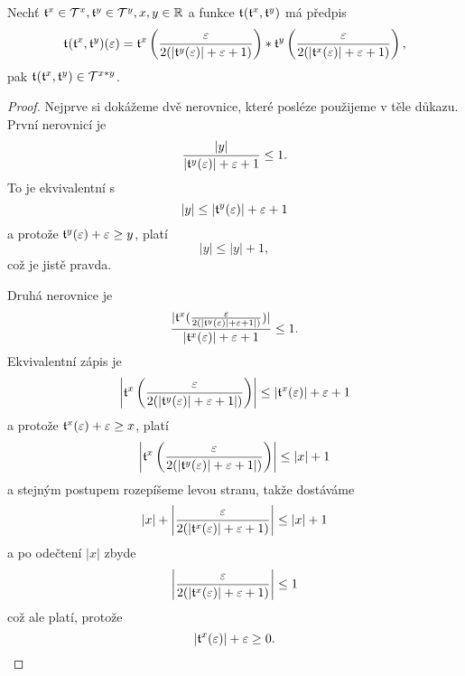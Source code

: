 \begin{theorem}\label{vet:soucin_dvou_tnumu}
Nechť $\mathfrak{t}^{x}\in\mathcal{T}^{x},\mathfrak{t}^{y}\in\mathcal{T}^{y},x,y\in\mathbb{R}$ a funkce $\mathfrak{t}^{}(\mathfrak{t}^{x},\mathfrak{t}^{y})$ má předpis
\begin{equation}
\mathfrak{t}^{}(\mathfrak{t}^{x},\mathfrak{t}^{y})(\varepsilon)=\mathfrak{t}^{x}\left(\frac{\varepsilon}{2(|\mathfrak{t}^{y}(\varepsilon)| + \varepsilon + 1)}\right)*\mathfrak{t}^{y}\left(\frac{\varepsilon}{2(|\mathfrak{t}^{x}(\varepsilon)| + \varepsilon + 1)}\right),
\end{equation}
pak $\mathfrak{t}^{}(\mathfrak{t}^{x},\mathfrak{t}^{y})\in\mathcal{T}^{x*y}$.

\begin{proof}
Nejprve si dokážeme dvě nerovnice, které posléze použijeme v těle důkazu.
První nerovnicí je 
\begin{equation}\label{duk:soucin_prvni}
\frac{|y|}{|\mathfrak{t}^{y}(\varepsilon)| + \varepsilon + 1}\leq 1.
\end{equation}
To je ekvivalentní s
\begin{equation}
|y|\leq |\mathfrak{t}^{y}(\varepsilon)|+\varepsilon+1
\end{equation}
a protože $\mathfrak{t}^{y}(\varepsilon)+\varepsilon\geq y$, platí
\begin{equation}
|y|\leq |y|+1,
\end{equation}
což je jistě pravda. 

Druhá nerovnice je
\begin{equation}\label{duk:soucin_druha}
\frac{|\mathfrak{t}^{x}(\frac{\varepsilon}{2(|\mathfrak{t}^{y}(\varepsilon)|+\varepsilon+1|)})|}{|\mathfrak{t}^{x}(\varepsilon)|+\varepsilon+1}\leq 1.
\end{equation}
Ekvivalentní zápis je
\begin{equation}
\left|\mathfrak{t}^{x}\left(\frac{\varepsilon}{2(|\mathfrak{t}^{y}(\varepsilon)|+\varepsilon+1|)}\right)\right|\leq |\mathfrak{t}^{x}(\varepsilon)|+\varepsilon+1
\end{equation}
a protože $\mathfrak{t}^{x}(\varepsilon)+\varepsilon\geq x$, platí
\begin{equation}
\left|\mathfrak{t}^{x}\left(\frac{\varepsilon}{2(|\mathfrak{t}^{y}(\varepsilon)|+\varepsilon+1|)}\right)\right|\leq |x|+1
\end{equation}
a stejným postupem rozepíšeme levou stranu, takže dostáváme
\begin{equation}
|x|+\left|\frac{\varepsilon}{2(|\mathfrak{t}^{x}(\varepsilon)|+\varepsilon+1)}\right|\leq |x|+1
\end{equation}
a po odečtení $|x|$ zbyde
\begin{equation}
\left|\frac{\varepsilon}{2(|\mathfrak{t}^{x}(\varepsilon)|+\varepsilon+1)}\right|\leq 1
\end{equation}
což ale platí, protože
\begin{equation}
|\mathfrak{t}^{x} (\varepsilon)|+\varepsilon\geq 0.
\end{equation}


\end{proof}
\end{theorem}
